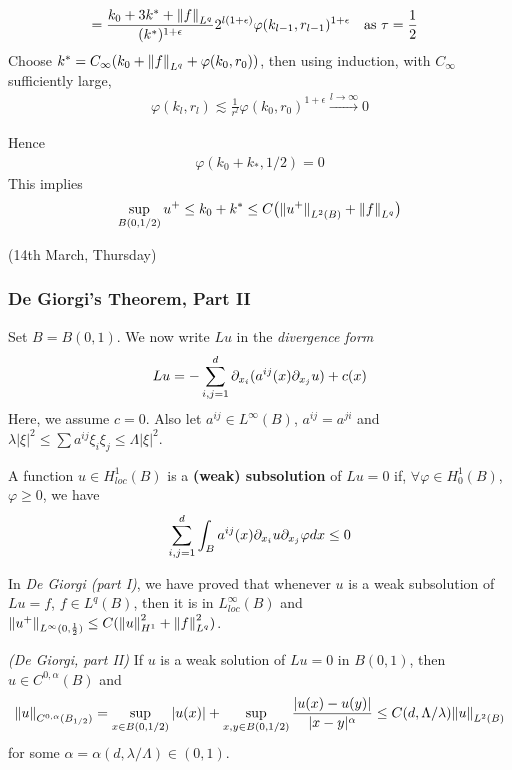 \documentclass[12pt,a4paper]{article}
\newenvironment{proof}
{\begin{changemargin}{0.5cm}{0.5cm} 
	}%
	{\end{changemargin}
}
\newenvironment{p}
{\begin{proof} 
	}%
	{\end{proof}
}
\begin{document}
\begin{p}
\begin{itemize}
\begin{align*}
&= \frac{k_0 + 3k^* + \snorms{f}{L^q}}{(k^*)^{1+ \epsilon}}  2^{l(1+\epsilon)} \varphi(k_{l-1},r_{l-1} )^{1+ \epsilon} \quad \text{as } \tau=\frac{1}{2}
\end{align*}
Choose $k^* = C_{\infty} (k_0 + \snorms{f}{L^q} + \varphi(k_0, r_0))$, then using induction, with $C_{\infty}$ sufficiently large,
\begin{align*}
\varphi(k_l, r_l) \lesssim \frac{1}{r^l} \varphi(k_0, r_0)^{1+\epsilon} \xrightarrow{l\rightarrow\infty} 0
\end{align*}
\end{itemize}
Hence
\begin{align*}
\varphi(k_0 + k_*, 1/2) =0
\end{align*}
This implies
\begin{align*}
\sup_{B(0,1/2)} u^+ \leq k_0 + k^* \leq C \big( \snorms{u^+}{L^2(B)} + \snorms{f}{L^q} \big)
\end{align*}
\eop 
\end{p}
\s

\newday

(14th March, Thursday)

\subsubsection*{De Giorgi's Theorem, Part II}

Set $B= B(0,1)$. We now write $Lu$ in the \emph{divergence form}
\begin{align*}
Lu = - \sum_{i,j=1}^d \partial_{x_i}(a^{ij}(x) \partial_{x_j} u) + c(x)
\end{align*}
Here, we assume $c=0$. Also let $a^{ij} \in L^{\infty}(B)$, $a^{ij}= a^{ji}$ and $\lambda |\xi|^2 \leq \sum a^{ij} \xi_i \xi_j \leq \Lambda |\xi|^2$. 
\s

 A function $u\in H^1_{loc}(B)$ is a \textbf{(weak) subsolution} of $Lu =0$ if, $\forall \varphi \in H_0^1(B)$, $\varphi \geq 0$, we have
\begin{align*}
\sum_{i,j=1}^d \int_B a^{ij}(x) \partial_{x_i} u \partial_{x_j} \varphi dx \leq 0
\end{align*}
\s

In \emph{De Giorgi (part I)}, we have proved that whenever $u$ is a weak subsolution of $Lu = f$, $f\in L^q(B)$, then it is in $L^{\infty}_{loc}(B)$ and $\snorms{u^+}{L^{\infty}(0, \frac{1}{2})} \leq C(\snorms{u}{H^1}^2 + \snorms{f}{L^q}^2)$.
\s

\thm \emph{(De Giorgi, part II)} If $u$ is a weak solution of $Lu=0$ in $B(0, 1)$, then $u\in C^{0, \alpha}(B)$ and
\begin{align*}
\snorms{u}{C^{0, \alpha}(B_{1/2})} = \sup_{x\in B(0, 1/2)} |u(x)| + \sup_{x,y\in B(0, 1/2)} \frac{|u(x) - u(y)|}{|x-y|^{\alpha}} \leq C(d, \Lambda/\lambda)\snorms{u}{L^2(B)}
\end{align*}
for some $\alpha = \alpha(d, \lambda/\Lambda) \in (0,1)$.
\s
\end{document}
